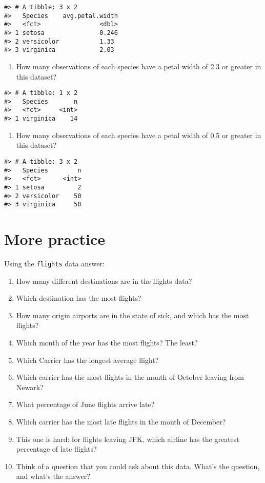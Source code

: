 \documentclass[
]{book}
\providecommand{\tightlist}{%
  \setlength{\itemsep}{0pt}\setlength{\parskip}{0pt}}
\begin{document}
\begin{verbatim}
#> # A tibble: 3 x 2
#>   Species    avg.petal.width
#>   <fct>                <dbl>
#> 1 setosa               0.246
#> 2 versicolor           1.33 
#> 3 virginica            2.03
\end{verbatim}

\begin{enumerate}
\def\labelenumi{\arabic{enumi}.}
\setcounter{enumi}{2}
\tightlist
\item
  How many observations of each species have a petal width of 2.3 or greater in this dataset?
\end{enumerate}

\begin{verbatim}
#> # A tibble: 1 x 2
#>   Species       n
#>   <fct>     <int>
#> 1 virginica    14
\end{verbatim}

\begin{enumerate}
\def\labelenumi{\arabic{enumi}.}
\setcounter{enumi}{3}
\tightlist
\item
  How many observations of each species have a petal width of 0.5 or greater in this dataset?
\end{enumerate}

\begin{verbatim}
#> # A tibble: 3 x 2
#>   Species        n
#>   <fct>      <int>
#> 1 setosa         2
#> 2 versicolor    50
#> 3 virginica     50
\end{verbatim}

\hypertarget{more-practice}{%
\section{More practice}\label{more-practice}}

Using the \texttt{flights} data answer:

\begin{enumerate}
\def\labelenumi{\arabic{enumi}.}
\tightlist
\item
  How many different destinations are in the flights data?
\item
  Which destination has the most flights?
\item
  How many origin airports are in the state of sick, and which has the most flights?
\item
  Which month of the year has the most flights? The least?\\
\item
  Which Carrier has the longest average flight?
\item
  Which carrier has the most flights in the month of October leaving from Newark?
\item
  What percentage of June flights arrive late?
\item
  Which carrier has the most late flights in the month of December?
\item
  This one is hard: for flights leaving JFK, which airline has the greatest percentage of late flights?
\item
  Think of a question that you could ask about this data. What's the question, and what's the answer?
\end{enumerate}
\end{document}
